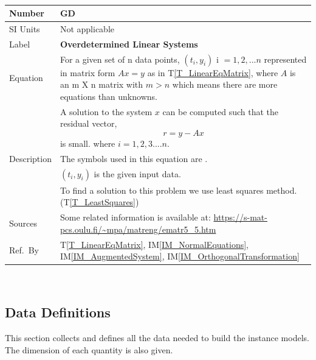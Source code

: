 \documentclass[12pt]{article}
\newcommand{\colAwidth}{0.13\textwidth}
\newcommand{\colBwidth}{0.82\textwidth}
\newcounter{defnum} %
\newcommand{\tref}[1]{T\ref{#1}}
\newcommand{\iref}[1]{IM\ref{#1}}
\begin{document}
~\newline
\noindent
\begin{minipage}{\textwidth}
	\renewcommand*{\arraystretch}{1.5}
	\begin{tabular}{| p{\colAwidth} | p{\colBwidth}|}
		\hline
		\rowcolor[gray]{0.9}
		Number& GD{defnum}\thedefnum
		\label{GD_OverdetLinearSys}\\
		\hline
		SI Units& Not applicable\\
		\hline
		Label & \bf Overdetermined Linear Systems\\
		\hline
		Equation
		& For a given set of n data points, $(t_i,y_i)$ i $= {1,2,...n}$ represented in matrix form $Ax = y$ as in \tref{T_LinearEqMatrix}, where $A$ is an m X n matrix with $m > n$ which means there are more equations than unknowns. \\		
		& A solution to the system $x$ can be computed such that the residual vector,
		\begin{equation*}
		r = y - Ax
		\end{equation*} is small. 
		where $i = 1,2,3 ....n$.\\
		\hline
		
		Description 
		& The symbols used in this equation are .\\
		& $(t_i,y_i)$ is the given input data.\\
		& To find a solution to this problem we use least squares method.(\tref{T_LeastSquares})\\
		\hline
		
		Sources& Some related information is available at:
		\url{https://s-mat-pcs.oulu.fi/~mpa/matreng/ematr5_5.htm}\\
		\hline
		Ref.\ By & \tref{T_LinearEqMatrix}, \iref{IM_NormalEquations}, \iref{IM_AugmentedSystem}, \iref{IM_OrthogonalTransformation}\\
		\hline
	\end{tabular}
\end{minipage}\\




\subsection{Data Definitions} \label{sec_datadef}

This section collects and defines all the data needed to build the instance
models. The dimension of each quantity is also given. 
\end{document}
